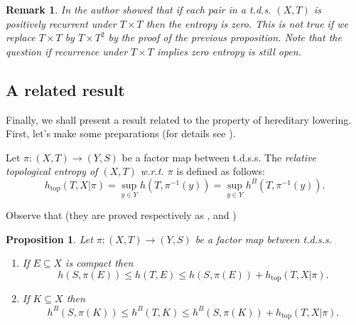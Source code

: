 \documentclass[12pt]{amsart}
\newtheorem{prop}[thm]{Proposition}
\newtheorem{rem}[thm]{Remark}
\theoremstyle{definition} \theoremstyle{question}
\numberwithin{equation}{section}
\begin{document}
\begin{rem} In \cite{Weiss} the author showed that if each pair in a
t.d.s. $(X,T)$ is positively recurrent under $T\times T$ then the
entropy is zero. This is not true if we replace $T\times T$ by
$T\times T^2$ by the proof of the previous proposition. Note that
the question if recurrence under $T\times T$ implies zero entropy is
still open.
\end{rem}

\subsection{A related result}

Finally, we shall present a result related to the property of
hereditary lowering. First, let's make some preparations (for
details see \cite {D2, HYZ1, Mi1, Z1}).

Let $\pi: (X, T)\rightarrow (Y, S)$ be a factor map between t.d.s.s.
The {\it relative topological entropy of $(X, T)$ w.r.t. $\pi$} is
defined as follows:
\begin{equation*}
h_{\text{top}} (T, X| \pi)= \sup_{y\in Y} h (T, \pi^{- 1} (y))=
\sup_{y\in Y} h^B (T, \pi^{- 1} (y)).
\end{equation*}

Observe that (they are proved respectively as \cite[Theorem
7.3]{HYZ1}, \cite[Theorem 3.3]{CHYZ} and \cite[Theorem 4.2]{Z1})

\begin{prop} \label{0905191311}
Let $\pi: (X, T)\rightarrow (Y, S)$ be a factor map between t.d.s.s.
\begin{enumerate}

\item If $E\subseteq X$ is compact then
$$h (S, \pi (E))\le h (T, E)\le h (S, \pi (E))+ h_{\text{top}} (T, X|
\pi).$$

\item If $K\subseteq X$ then
$$h^B (S, \pi (K))\le h^B (T, K)\le h^B (S, \pi (K))+ h_{\text{top}}
(T, X| \pi).$$
\end{enumerate}
\end{prop}
\end{document}
